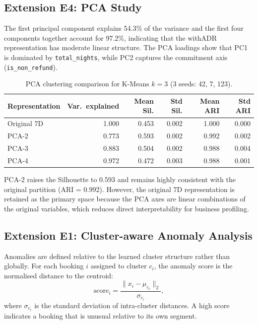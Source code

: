 \documentclass[11pt,a4paper]{article}
\begin{document}
\subsection{Extension E4: PCA Study}

The first principal component explains 54.3\% of the variance and the first four components together account for 97.2\%, indicating that the withADR representation has moderate linear structure. The PCA loadings show that PC1 is dominated by \texttt{total\_nights}, while PC2 captures the commitment axis (\texttt{is\_non\_refund}).

\begin{table}[H]
\centering
\caption{PCA clustering comparison for K-Means $k=3$ (3 seeds: 42, 7, 123).}
\label{tab:e4-pca}
\begin{tabular}{lrrrrr}
\toprule
\textbf{Representation} & \textbf{Var.\ explained} & \textbf{Mean Sil.} & \textbf{Std Sil.} & \textbf{Mean ARI} & \textbf{Std ARI} \\
\midrule
Original 7D & 1.000 & 0.453 & 0.002 & 1.000 & 0.000 \\
PCA-2       & 0.773 & 0.593 & 0.002 & 0.992 & 0.002 \\
PCA-3       & 0.883 & 0.504 & 0.002 & 0.988 & 0.004 \\
PCA-4       & 0.972 & 0.472 & 0.003 & 0.988 & 0.001 \\
\bottomrule
\end{tabular}
\end{table}

PCA-2 raises the Silhouette to 0.593 and remains highly consistent with the original partition (ARI = 0.992). However, the original 7D representation is retained as the primary space because the PCA axes are linear combinations of the original variables, which reduces direct interpretability for business profiling.
\subsection{Extension E1: Cluster-aware Anomaly Analysis}

Anomalies are defined relative to the learned cluster structure rather than globally. For each booking $i$ assigned to cluster $c_i$, the anomaly score is the normalised distance to the centroid:
\[
\text{score}_i = \frac{\|x_i - \mu_{c_i}\|_2}{\sigma_{c_i}},
\]
where $\sigma_{c_i}$ is the standard deviation of intra-cluster distances. A high score indicates a booking that is unusual relative to its own segment.
\end{document}
